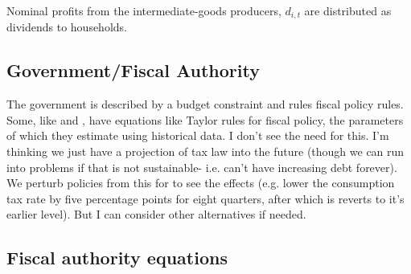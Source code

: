 \documentclass[article,11pt,letterpaper,fleqn]{article}
\theoremstyle{definition}
\numberwithin{equation}{section}
\newcommand{\cn}{\citeasnoun} %
\begin{document}
Nominal profits from the intermediate-goods producers, $d_{i,t}$ are distributed as dividends to households.


\subsection{Government/Fiscal Authority}

The government is described by a budget constraint and rules fiscal policy rules.  Some, like \cn{Zubairy2010} and \cn{TY2010}, have equations like Taylor rules for fiscal policy, the parameters of which they estimate using historical data.  I don't see the need for this.  I'm thinking we just have a projection of tax law into the future (though we can run into problems if that is not sustainable- i.e. can't have increasing debt forever).  We perturb policies from this for to see the effects (e.g. lower the consumption tax rate by five percentage points for eight quarters, after which is reverts to it's earlier level).  But I can consider other alternatives if needed.

\subsection{Fiscal authority equations}\label{TAppSecFiscAuth}
\end{document}
